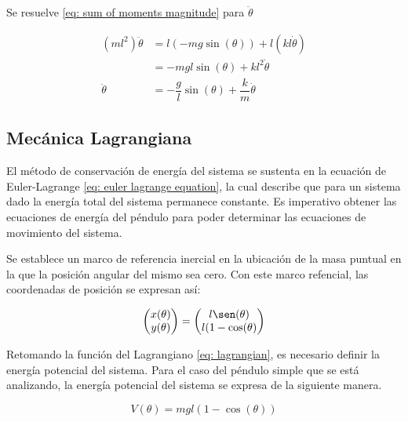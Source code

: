 Se resuelve \eqref{eq: sum of moments magnitude} para $\ddot{\theta}$


\begin{equation}
\begin{split}
 (m l^2) \ddot{\theta} &= l (-m g \sin(\theta))  + l (k l \dot{\theta})\\
 &= - mgl \sin(\theta) + kl^2 \dot{\theta}\\
 \ddot{\theta} &= - \dfrac{g}{l} \sin(\theta) + \dfrac{k}{m} \dot{\theta}
\end{split}
 \label{eq: angular acceleration newton}
\end{equation}


\subsection{Mecánica Lagrangiana}

El método de conservación de energía del sistema se sustenta
en la ecuación de Euler-Lagrange \eqref{eq: euler lagrange equation}, 
la cual describe que para un sistema dado la 
energía total del sistema permanece constante.
Es imperativo obtener las ecuaciones de energía del péndulo
para poder determinar las ecuaciones de movimiento del sistema.

Se establece un marco de referencia inercial en la ubicación de
la masa puntual en la que la posición angular del mismo sea cero.
Con este marco refencial, las coordenadas de posición se expresan
así: 

\begin{equation}
\begin{pmatrix}
x(\theta)\\
y(\theta)
\end{pmatrix}
= 
\begin{pmatrix}
l\sen(\theta)\\
l(1 - \cos(\theta)
\end{pmatrix}
\label{eq: lagrange position coordinates}
\end{equation}


Retomando la función del Lagrangiano \eqref{eq: lagrangian}, 
es necesario definir la energía potencial del sistema.
Para el caso del péndulo simple que se está analizando, 
la energía potencial del sistema se expresa de la siguiente manera.

\begin{equation}
 V(\theta) = m g l ( 1 - \cos (\theta) )
 \label{V_equ}
\end{equation}

